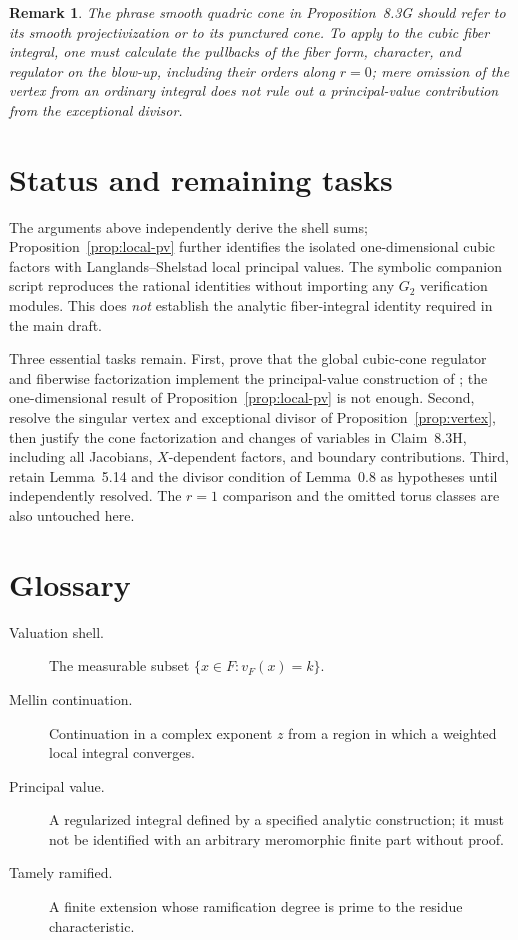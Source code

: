 \documentclass[12pt,letterpaper]{amsart}
\newtheorem{remark}[lemma]{Remark}
\begin{document}
\begin{remark}
The phrase \emph{smooth quadric cone} in Proposition~8.3G should refer to
its smooth projectivization or to its punctured cone. To apply
\cite[Lemmas 1.D and 1.F]{LS83} to the cubic fiber integral, one must
calculate the pullbacks of the fiber form, character, and regulator on
the blow-up, including their orders along $r=0$; mere omission of the
vertex from an ordinary integral does not rule out a principal-value
contribution from the exceptional divisor.
\end{remark}

\section{Status and remaining tasks}
The arguments above independently derive the shell sums; Proposition~\ref{prop:local-pv} further identifies the isolated one-dimensional cubic factors with Langlands--Shelstad local principal values. The symbolic companion script reproduces the rational identities without importing any $G_2$ verification modules. This does \emph{not} establish the analytic fiber-integral identity required in the main draft.

Three essential tasks remain. First, prove that the global cubic-cone regulator and fiberwise factorization implement the principal-value construction of \cite{LS83}; the one-dimensional result of Proposition~\ref{prop:local-pv} is not enough. Second, resolve the singular vertex and exceptional divisor of Proposition~\ref{prop:vertex}, then justify the cone factorization and changes of variables in Claim~8.3H, including all Jacobians, $X$-dependent factors, and boundary contributions. Third, retain Lemma~5.14 and the divisor condition of Lemma~0.8 as hypotheses until independently resolved. The $r=1$ comparison and the omitted torus classes are also untouched here.

\section*{Glossary}
\begin{description}
\item[Valuation shell.] The measurable subset $\{x\in F:v_F(x)=k\}$.
\item[Mellin continuation.] Continuation in a complex exponent $z$ from a region in which a weighted local integral converges.
\item[Principal value.] A regularized integral defined by a specified analytic construction; it must not be identified with an arbitrary meromorphic finite part without proof.
\item[Tamely ramified.] A finite extension whose ramification degree is prime to the residue characteristic.
\end{description}
\end{document}
